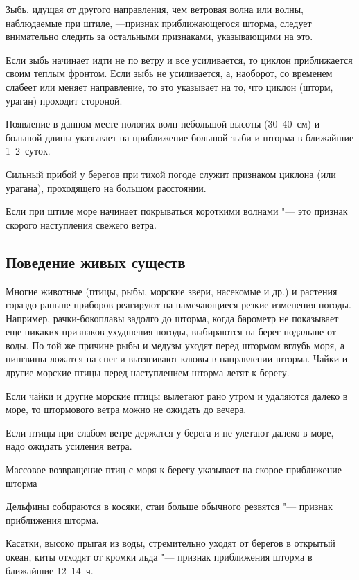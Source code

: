  Зыбь, идущая от другого направления, чем ветровая волна или
волны, наблюдаемые при штиле, —признак приближающегося шторма, следует
внимательно следить за остальными признаками, указывающими на это.

 Если зыбь начинает идти не по ветру и все усиливается, то
циклон приближается своим теплым фронтом. Если зыбь не усиливается, а,
наоборот, со временем слабеет или меняет направление, то это указывает
на то, что циклон (шторм, ураган) проходит стороной.

 Появление в данном месте пологих волн небольшой высоты (30--40~см)
и большой длины указывает на приближение большой зыби и шторма в
ближайшие 1--2~суток.

 Сильный прибой у берегов при тихой погоде служит признаком
циклона (или урагана), проходящего на большом расстоянии.

 Если при штиле море начинает покрываться короткими волнами
"--- это признак скорого наступления свежего ветра.

\subsection{Поведение живых существ}

Многие животные (птицы, рыбы, морские звери, насекомые и др.) и
растения гораздо раньше приборов реагируют на намечающиеся резкие
изменения погоды. Например, рачки-бокоплавы задолго до шторма, когда
барометр не показывает еще никаких признаков ухудшения погоды,
выбираются на берег подальше от воды. По той же причине рыбы и медузы
уходят перед штормом вглубь моря, а пингвины ложатся на снег и
вытягивают клювы в направлении шторма. Чайки и другие морские птицы
перед наступлением шторма летят к берегу.

 Если чайки и другие морские птицы вылетают рано утром и
удаляются далеко в море, то штормового ветра можно не ожидать до
вечера.

 Если птицы при слабом ветре держатся у берега и не улетают далеко
в море, надо ожидать усиления ветра.

 Массовое возвращение птиц с моря к берегу указывает на скорое
приближение шторма

 Дельфины собираются в косяки, стаи больше обычного резвятся
"--- признак приближения шторма.

 Касатки, высоко прыгая из воды, стремительно уходят от берегов
в открытый океан, киты отходят от кромки льда "--- признак приближения
шторма в ближайшие 12--14~ч.


